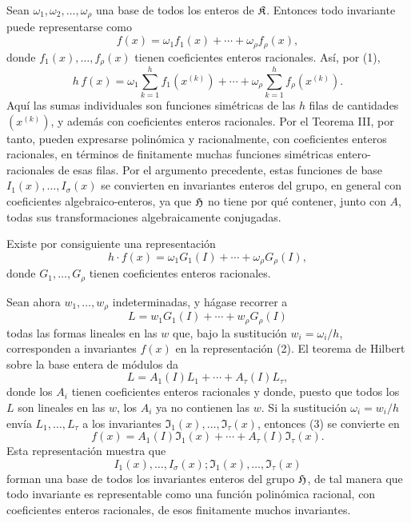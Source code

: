 Sean \(\omega_1,\omega_2,\ldots,\omega_\rho\) una base de todos los enteros de \(\mathfrak K\). Entonces todo invariante puede representarse como
\[
        f(x)=\omega_1 f_1(x)+\cdots+\omega_\rho f_\rho(x),
\]
donde \(f_1(x),\ldots,f_\rho(x)\) tienen coeficientes enteros racionales. Así, por (1),
\[
        h\,f(x)
        =
        \omega_1\sum_{k=1}^{h}f_1(x^{(k)})
        +\cdots+
        \omega_\rho\sum_{k=1}^{h}f_\rho(x^{(k)}).
\]
Aquí las sumas individuales son funciones simétricas de las \(h\) filas de cantidades \((x^{(k)})\), y además con coeficientes enteros racionales. Por el Teorema III, por tanto, pueden expresarse polinómica y racionalmente, con coeficientes enteros racionales, en términos de finitamente muchas funciones simétricas entero-racionales de esas filas. Por el argumento precedente, estas funciones de base \(I_1(x),\ldots,I_\sigma(x)\) se convierten en invariantes enteros del grupo, en general con coeficientes algebraico-enteros, ya que \(\mathfrak H\) no tiene por qué contener, junto con \(A\), todas sus transformaciones algebraicamente conjugadas.

Existe por consiguiente una representación
\begin{equation}
        h\cdot f(x)=\omega_1G_1(I)+\cdots+\omega_\rho G_\rho(I),
\end{equation}
donde \(G_1,\ldots,G_\rho\) tienen coeficientes enteros racionales.

Sean ahora \(w_1,\ldots,w_\rho\) indeterminadas, y hágase recorrer a
\[
        L=w_1G_1(I)+\cdots+w_\rho G_\rho(I)
\]
todas las formas lineales en las \(w\) que, bajo la sustitución \(w_i=\omega_i/h\), corresponden a invariantes \(f(x)\) en la representación (2). El teorema de Hilbert sobre la base entera de módulos da
\begin{equation}
        L=A_1(I)L_1+\cdots+A_\tau(I)L_\tau,
\end{equation}
donde los \(A_i\) tienen coeficientes enteros racionales y donde, puesto que todos los \(L\) son lineales en las \(w\), los \(A_i\) ya no contienen las \(w\). Si la sustitución \(\omega_i=w_i/h\) envía \(L_1,\ldots,L_\tau\) a los invariantes \(\mathfrak I_1(x),\ldots,\mathfrak I_\tau(x)\), entonces (3) se convierte en
\begin{equation}
        f(x)=A_1(I)\mathfrak I_1(x)+\cdots+A_\tau(I)\mathfrak I_\tau(x).
\end{equation}
Esta representación muestra que
\[
        I_1(x),\ldots,I_\sigma(x);\mathfrak I_1(x),\ldots,\mathfrak I_\tau(x)
\]
forman una base de todos los invariantes enteros del grupo \(\mathfrak H\), de tal manera que todo invariante es representable como una función polinómica racional, con coeficientes enteros racionales, de esos finitamente muchos invariantes.

